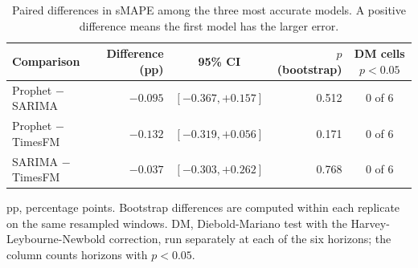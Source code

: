 \begin{table}[htbp]
\centering
\small
\caption{Paired differences in sMAPE among the three most accurate models. A positive difference means the first model has the larger error.}
\label{tab:pares}
\begin{tabular}{lrcrc}
\toprule
Comparison & Difference (pp) & 95\% CI & $p$ (bootstrap) & DM cells $p<0.05$ \\
\midrule
Prophet $-$ SARIMA & $-0.095$ & $[-0.367, +0.157]$ & 0.512 & 0 of 6 \\
Prophet $-$ TimesFM & $-0.132$ & $[-0.319, +0.056]$ & 0.171 & 0 of 6 \\
SARIMA $-$ TimesFM & $-0.037$ & $[-0.303, +0.262]$ & 0.768 & 0 of 6 \\
\bottomrule
\end{tabular}

\vspace{0.5em}
\begin{minipage}{\textwidth}
\footnotesize
pp, percentage points. Bootstrap differences are computed within each replicate on the same resampled windows. DM, Diebold-Mariano test with the Harvey-Leybourne-Newbold correction, run separately at each of the six horizons; the column counts horizons with $p<0.05$.
\end{minipage}
\end{table}
